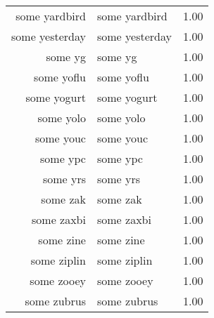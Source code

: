\begin{table}[ht]
\begin{tabular}{rlr}
  some yardbird & some yardbird & 1.00 \\ 
  some yesterday & some yesterday & 1.00 \\ 
  some yg & some yg & 1.00 \\ 
  some yoflu & some yoflu & 1.00 \\ 
  some yogurt & some yogurt & 1.00 \\ 
  some yolo & some yolo & 1.00 \\ 
  some youc & some youc & 1.00 \\ 
  some ypc & some ypc & 1.00 \\ 
  some yrs & some yrs & 1.00 \\ 
  some zak & some zak & 1.00 \\ 
  some zaxbi & some zaxbi & 1.00 \\ 
  some zine & some zine & 1.00 \\ 
  some ziplin & some ziplin & 1.00 \\ 
  some zooey & some zooey & 1.00 \\ 
  some zubrus & some zubrus & 1.00 \\ 
   \hline
\end{tabular}
\end{table}
